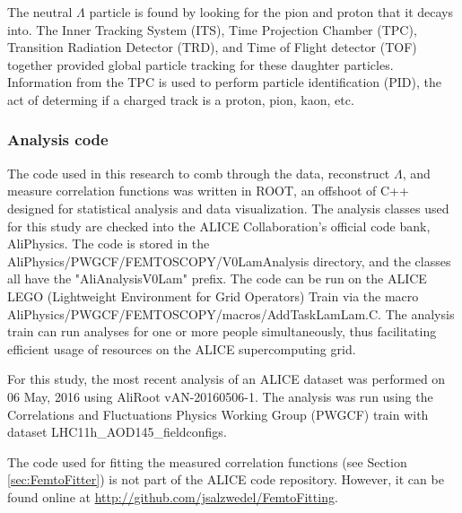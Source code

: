 The neutral $\Lambda$ particle is found by looking for the pion and proton that it decays into.
The Inner Tracking System (ITS), Time Projection Chamber (TPC), Transition Radiation Detector (TRD), and Time of Flight detector (TOF) together provided global particle tracking for these daughter particles.
Information from the TPC is used to perform particle identification (PID), the act of determing if a charged track is a proton, pion, kaon, etc.


\subsubsection{Analysis code}
The code used in this research to comb through the data, reconstruct $\Lambda$, and measure correlation functions was written in ROOT, an offshoot of C++ designed for statistical analysis and data visualization.
The analysis classes used for this study are checked into the ALICE Collaboration's official code bank, AliPhysics.
The code is stored in the AliPhysics/PWGCF/FEMTOSCOPY/V0LamAnalysis directory, and the classes all have the "AliAnalysisV0Lam" prefix.
The code can be run on the ALICE LEGO (Lightweight Environment for Grid Operators) Train via the macro AliPhysics/PWGCF/FEMTOSCOPY/macros/AddTaskLamLam.C.
The analysis train can run analyses for one or more people simultaneously, thus facilitating efficient usage of resources on the ALICE supercomputing grid.

For this study, the most recent analysis of an ALICE dataset was performed on 06 May, 2016 using AliRoot vAN-20160506-1.
The analysis was run using the Correlations and Fluctuations Physics Working Group (PWGCF) train with dataset LHC11h\_AOD145\_fieldconfigs.

The code used for fitting the measured correlation functions (see Section \ref{sec:FemtoFitter}) is not part of the ALICE code repository.
However, it can be found online at \url{http://github.com/jsalzwedel/FemtoFitting}.